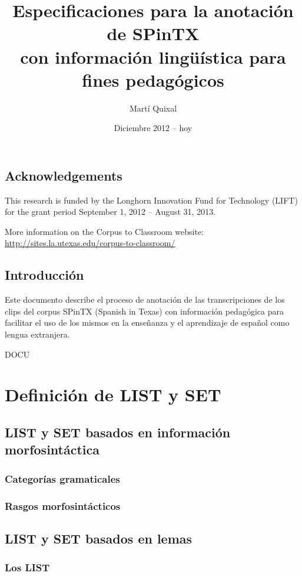 \documentclass[11pt]{report}
\begin{document}
\title{Especificaciones para la anotación de SPinTX\\ con información lingüística para fines pedagógicos}
\author{Martí Quixal}
\date{Diciembre 2012 -- hoy}
\maketitle
\tableofcontents

\cleardoublepage

\chapter*{Acknowledgements}
This research is funded by the Longhorn Innovation Fund for Technology (LIFT) for the grant period September 1, 2012 – August 31, 2013.

More information on the Corpus to Classroom website:\\
\url{http://sites.la.utexas.edu/corpus-to-classroom/}

\chapter*{Introducción}
Este documento describe el proceso de anotación de las transcripciones de los clips del corpus SPinTX (Spanish in Texas) con información pedagógica para facilitar el uso de los mismos en la enseñanza y el aprendizaje de español como lengua extranjera.

DOCU 
\part{Definición de LIST y SET}
\chapter{LIST y SET basados en información morfosintáctica}
\section{Categorías gramaticales}
\section{Rasgos morfosintácticos}
\chapter{LIST y SET basados en lemas}
\section{Los LIST}
\end{document}
